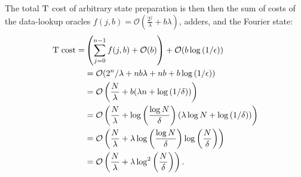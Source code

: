 \documentclass[a4paper,onecolumn,10pt,accepted=2024-05-22]{quantumarticle}
\begin{document}
	
	The total $\textsc{T}$ cost of arbitrary state preparation is then then the sum of costs of the data-lookup oracles $f(j,b)=\mathcal{O}(\frac{2^j}{\lambda}+b\lambda)$, adders, and the Fourier state:
	\begin{align}\nonumber
	\textsc{T}\;\text{cost}=&\left(\sum_{j=0}^{n-1}f(j,b)+\mathcal{O}(b)\right)+\mathcal{O}(b\log{(1/\epsilon)})\\\nonumber
	&=\mathcal{O}(2^n/\lambda+nb\lambda+nb+b\log{(1/\epsilon)})\\\nonumber
	&=\mathcal{O}\left(\frac{N}{\lambda}+b(\lambda n + \log{(1/\delta)})\right)\\\nonumber
 &=\mathcal{O}\left(\frac{N}{\lambda}+\log{\left(\frac{\log{N}}{\delta}\right)}\left(\lambda \log{N}+\log{(1/\delta)}\right)\right)
 \\\nonumber
 &=\mathcal{O}\left(\frac{N}{\lambda}+\lambda\log{\left(\frac{\log{N}}{\delta}\right)} \log{\left(\frac{N}{\delta}\right)}\right)
 \\
 &=\mathcal{O}\left(\frac{N}{\lambda}+\lambda \log^2{\left(\frac{N}{\delta}\right)}\right).
	\end{align}
	
	
	
	
	
	
\end{document}
